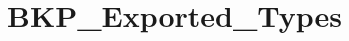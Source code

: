 \hypertarget{group___b_k_p___exported___types}{}\section{B\+K\+P\+\_\+\+Exported\+\_\+\+Types}
\label{group___b_k_p___exported___types}
